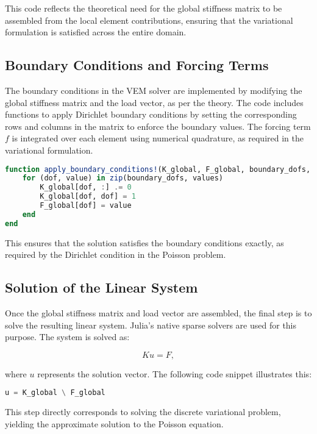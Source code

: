 \documentclass[class=article, crop=false]{standalone}
\begin{document}
This code reflects the theoretical need for the global stiffness matrix to be assembled from the local element contributions, ensuring that the variational formulation is satisfied across the entire domain.

\subsection{Boundary Conditions and Forcing Terms}

The boundary conditions in the VEM solver are implemented by modifying the global stiffness matrix and the load vector, as per the theory. The code includes functions to apply Dirichlet boundary conditions by setting the corresponding rows and columns in the matrix to enforce the boundary values. The forcing term $f$ is integrated over each element using numerical quadrature, as required in the variational formulation.

\begin{lstlisting}[language=Julia, caption={Boundary Condition Application}]
function apply_boundary_conditions!(K_global, F_global, boundary_dofs, values)
    for (dof, value) in zip(boundary_dofs, values)
        K_global[dof, :] .= 0
        K_global[dof, dof] = 1
        F_global[dof] = value
    end
end
\end{lstlisting}

This ensures that the solution satisfies the boundary conditions exactly, as required by the Dirichlet condition in the Poisson problem.

\subsection{Solution of the Linear System}

Once the global stiffness matrix and load vector are assembled, the final step is to solve the resulting linear system. Julia's native sparse solvers are used for this purpose. The system is solved as:

\[
K u = F,
\]

where $u$ represents the solution vector. The following code snippet illustrates this:

\begin{lstlisting}[language=Julia, caption={Solution of Linear System}]
u = K_global \ F_global
\end{lstlisting}

This step directly corresponds to solving the discrete variational problem, yielding the approximate solution to the Poisson equation.
\end{document}
